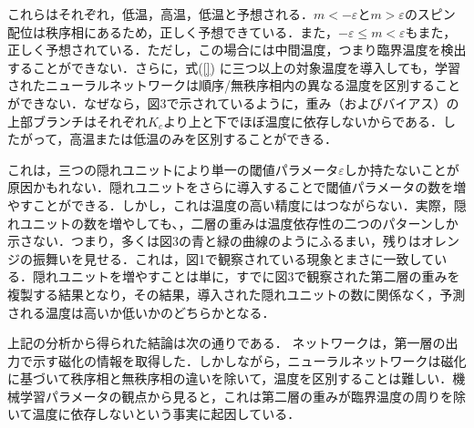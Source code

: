 \documentclass[a4paper,11pt]{jsarticle}
\begin{document}
これらはそれぞれ，低温，高温，低温と予想される．$m<-\varepsilon$と$m>\varepsilon$のスピン配位は秩序相にあるため，正しく予想できている．また，$-\varepsilon \leq m < \varepsilon$もまた，正しく予想されている．ただし，この場合には中間温度，つまり臨界温度を検出することができない．さらに，式(\ref{}) に三つ以上の対象温度を導入しても，学習されたニューラルネットワークは順序/無秩序相内の異なる温度を区別することができない．なぜなら，図3で示されているように，重み（およびバイアス）の上部ブランチはそれぞれ$K_c$より上と下でほぼ温度に依存しないからである．したがって，高温または低温のみを区別することができる．\par
これは，三つの隠れユニットにより単一の閾値パラメータ$\varepsilon$しか持たないことが原因かもれない．隠れユニットをさらに導入することで閾値パラメータの数を増やすことができる．しかし，これは温度の高い精度にはつながらない．実際，隠れユニットの数を増やしても、，二層の重みは温度依存性の二つのパターンしか示さない．つまり，多くは図3の青と緑の曲線のようにふるまい，残りはオレンジの振舞いを見せる．これは，図1で観察されている現象とまさに一致している．隠れユニットを増やすことは単に，すでに図3で観察された第二層の重みを複製する結果となり，その結果，導入された隠れユニットの数に関係なく，予測される温度は高いか低いかのどちらかとなる．\par
上記の分析から得られた結論は次の通りである．
ネットワークは，第一層の出力で示す磁化の情報を取得した．しかしながら，ニューラルネットワークは磁化に基づいて秩序相と無秩序相の違いを除いて，温度を区別することは難しい．機械学習パラメータの観点から見ると，これは第二層の重みが臨界温度の周りを除いて温度に依存しないという事実に起因している．
\end{document}
